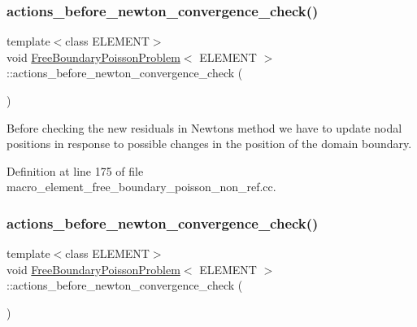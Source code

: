 \subsubsection{\texorpdfstring{actions\+\_\+before\+\_\+newton\+\_\+convergence\+\_\+check()}{actions\_before\_newton\_convergence\_check()}\hspace{0.1cm}{\footnotesize\ttfamily [1/2]}}
{\footnotesize\ttfamily template$<$class E\+L\+E\+M\+E\+NT$>$ \\
void \hyperlink{classFreeBoundaryPoissonProblem}{Free\+Boundary\+Poisson\+Problem}$<$ E\+L\+E\+M\+E\+NT $>$\+::actions\+\_\+before\+\_\+newton\+\_\+convergence\+\_\+check (\begin{DoxyParamCaption}{ }\end{DoxyParamCaption})\hspace{0.3cm}{\ttfamily [inline]}}



Before checking the new residuals in Newton\textquotesingle{}s method we have to update nodal positions in response to possible changes in the position of the domain boundary. 



Definition at line 175 of file macro\+\_\+element\+\_\+free\+\_\+boundary\+\_\+poisson\+\_\+non\+\_\+ref.\+cc.

\mbox{\label{classFreeBoundaryPoissonProblem_a885a6e3a4efd1f02314806dced566569}} 
\subsubsection{\texorpdfstring{actions\+\_\+before\+\_\+newton\+\_\+convergence\+\_\+check()}{actions\_before\_newton\_convergence\_check()}\hspace{0.1cm}{\footnotesize\ttfamily [2/2]}}
{\footnotesize\ttfamily template$<$class E\+L\+E\+M\+E\+NT$>$ \\
void \hyperlink{classFreeBoundaryPoissonProblem}{Free\+Boundary\+Poisson\+Problem}$<$ E\+L\+E\+M\+E\+NT $>$\+::actions\+\_\+before\+\_\+newton\+\_\+convergence\+\_\+check (\begin{DoxyParamCaption}{ }\end{DoxyParamCaption})\hspace{0.3cm}{\ttfamily [inline]}}



